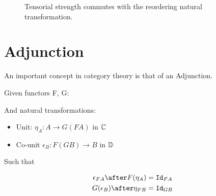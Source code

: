 \documentclass{Report}
\begin{document}
\begin{figure}
    \centering
    \begin{minipage}{0.45\textwidth}
        \label{TensorStrengthAlpha}
    \end{minipage}
    \caption{Tensorial strength commutes with the reordering natural transformation.}
\end{figure}






\section{Adjunction}
An important concept in category theory is that of an Adjunction.

Given functors F, G:


And natural transformations:

\begin{itemize}
    \item Unit: $\eta_A: A \rightarrow G(F A)$ in $\mathbb{C}$
    \item Co-unit $\epsilon_B: F(G B) \rightarrow B$ in $\mathbb{D}$
\end{itemize}

Such that 

\begin{align}
    \epsilon_{F A}\after F(\eta_A) & = \Id{F A} \\
    G(\epsilon_B)\after \eta_{F B} & = \Id{G B}
\end{align}
\end{document}
